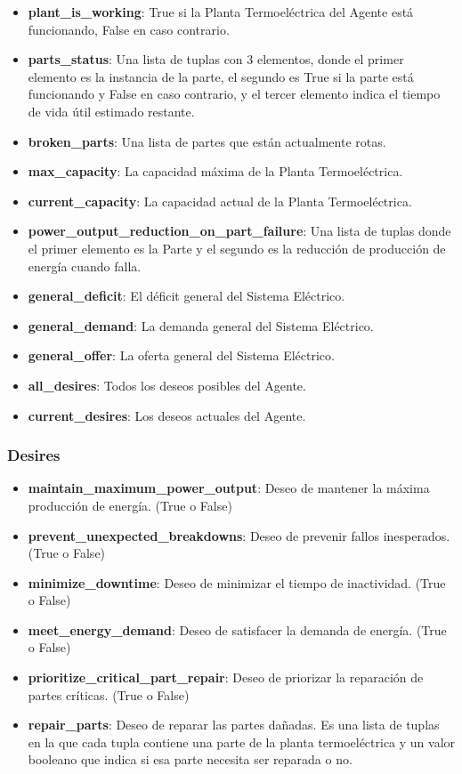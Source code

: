 \documentclass[twocolumn, fontsize=10pt]{article}
\begin{document}
\begin{itemize}
  \item \textbf{plant\_is\_working}: True si la Planta Termoeléctrica del Agente está funcionando, False en caso contrario.
  \item \textbf{parts\_status}: Una lista de tuplas con 3 elementos, donde el primer elemento es la instancia de la parte, el segundo es True si la parte está funcionando y False en caso contrario, y el tercer elemento indica el tiempo de vida útil estimado restante.
  \item \textbf{broken\_parts}: Una lista de partes que están actualmente rotas.
  \item \textbf{max\_capacity}: La capacidad máxima de la Planta Termoeléctrica.
  \item \textbf{current\_capacity}: La capacidad actual de la Planta Termoeléctrica.
  \item \textbf{power\_output\_reduction\_on\_part\_failure}: Una lista de tuplas donde el primer elemento es la Parte y el segundo es la reducción de producción de energía cuando falla.
  \item \textbf{general\_deficit}: El déficit general del Sistema Eléctrico.
  \item \textbf{general\_demand}: La demanda general del Sistema Eléctrico.
  \item \textbf{general\_offer}: La oferta general del Sistema Eléctrico.
  \item \textbf{all\_desires}: Todos los deseos posibles del Agente.
  \item \textbf{current\_desires}: Los deseos actuales del Agente.
\end{itemize}
\subsubsection{Desires}
\begin{itemize}
  
  \item \textbf{maintain\_maximum\_power\_output}: Deseo de mantener la máxima producción de energía. (True o False)
  \item \textbf{prevent\_unexpected\_breakdowns}: Deseo de prevenir fallos inesperados. (True o False)
  \item \textbf{minimize\_downtime}: Deseo de minimizar el tiempo de inactividad. (True o False)
  \item \textbf{meet\_energy\_demand}: Deseo de satisfacer la demanda de energía. (True o False)
  \item \textbf{prioritize\_critical\_part\_repair}: Deseo de priorizar la reparación de partes críticas. (True o False)
  \item \textbf{repair\_parts}: Deseo de reparar las partes dañadas. Es una lista de tuplas en la que cada tupla contiene una parte de la planta termoeléctrica y un valor booleano que indica si esa parte necesita ser reparada o no.

\end{itemize}
\end{document}
